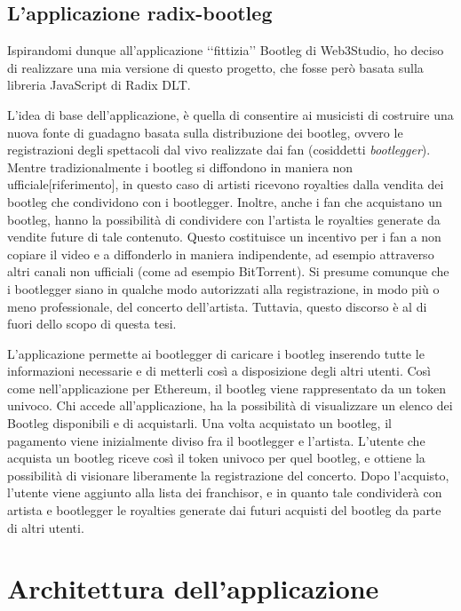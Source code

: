\subsection{L'applicazione radix-bootleg}
Ispirandomi dunque all'applicazione ‘‘fittizia’’ Bootleg di Web3Studio, ho deciso di realizzare una mia versione di questo progetto, che fosse però basata sulla libreria JavaScript di Radix DLT. 

L'idea di base dell'applicazione, è quella di consentire ai musicisti di costruire una nuova fonte di guadagno basata sulla distribuzione dei bootleg, ovvero le registrazioni degli spettacoli dal vivo realizzate dai fan (cosiddetti \textit{bootlegger}). Mentre tradizionalmente i bootleg si diffondono in maniera non ufficiale[riferimento], in questo caso di artisti ricevono royalties dalla vendita dei bootleg che condividono con i bootlegger. Inoltre, anche i fan che acquistano un bootleg, hanno la possibilità di condividere con l'artista le royalties generate da vendite future di tale contenuto. Questo costituisce un incentivo per i fan a non copiare il video e a diffonderlo in maniera indipendente, ad esempio attraverso altri canali non ufficiali (come ad esempio BitTorrent). Si presume comunque che i bootlegger siano in qualche modo autorizzati alla registrazione, in modo più o meno professionale, del concerto dell'artista. Tuttavia, questo discorso è al di fuori dello scopo di questa tesi.

L'applicazione permette ai bootlegger di caricare i bootleg inserendo tutte le informazioni necessarie e di metterli così a disposizione degli altri utenti. Così come nell'applicazione per Ethereum, il bootleg viene rappresentato da un token univoco. Chi accede all'applicazione, ha la possibilità di visualizzare un elenco dei Bootleg disponibili e di acquistarli. Una volta acquistato un bootleg, il pagamento viene inizialmente diviso fra il bootlegger e l'artista. L'utente che acquista un bootleg riceve così il token univoco per quel bootleg, e ottiene la possibilità di visionare liberamente la registrazione del concerto. Dopo l'acquisto, l'utente viene aggiunto alla lista dei franchisor, e in quanto tale condividerà con artista e bootlegger le royalties generate dai futuri acquisti del bootleg da parte di altri utenti.

\section{Architettura dell'applicazione}

